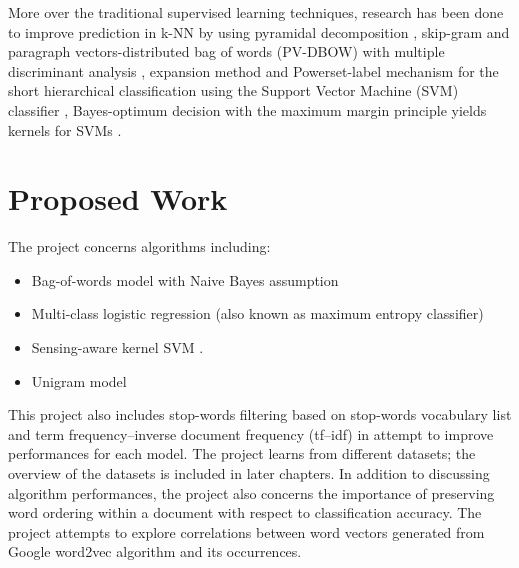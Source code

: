 \documentclass[a4paper, 11pt]{article}
\begin{document}
More over the traditional supervised learning techniques, research has been done to improve prediction in k-NN by using pyramidal decomposition \cite{heroux1998classification},  skip-gram and paragraph vectors-distributed bag of words (PV-DBOW) with multiple discriminant analysis \cite{lauren2018discriminant}, expansion method and Powerset-label mechanism for the short hierarchical classification using the Support Vector Machine (SVM) classifier \cite{salih2018term}, Bayes-optimum decision with the maximum margin principle yields kernels for SVMs \cite{ding2014sensing}.

\section{Proposed Work}
The project concerns algorithms including:
\begin{itemize}
\item Bag-of-words model with Naive Bayes assumption
\item Multi-class logistic regression (also known as maximum entropy classifier)
\item Sensing-aware kernel SVM \cite{ding2014sensing}.
\item Unigram model
\end{itemize}
 This project also includes stop-words filtering based on stop-words vocabulary list and term frequency–inverse document frequency (tf–idf) in attempt to improve performances for each model. The project learns from different datasets; the overview of the datasets is included in later chapters. In addition to discussing algorithm performances, the project also concerns the importance of preserving word ordering within a document with respect to classification accuracy. The project attempts to explore correlations between word vectors generated from Google word2vec algorithm and its occurrences. 
\end{document}
